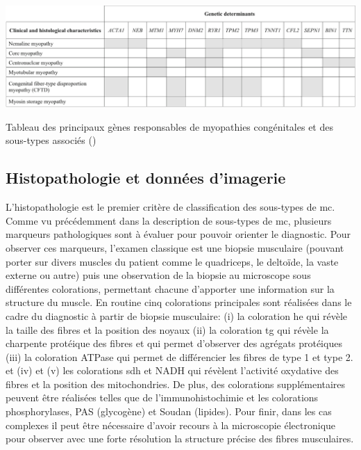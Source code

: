 \begin{table}[!ht]
\centering
\includegraphics[width=1\textwidth]{figures/gene_tab.png}
\caption{Tableau des principaux gènes responsables de myopathies congénitales et des sous-types associés (\cite{cassandrini_congenital_2017})}
\label{tab:gene_myo}
\end{table}
\subsection{Histopathologie et données d'imagerie }
L'histopathologie est le premier critère de classification des sous-types de \gls{mc}. Comme vu précédemment dans la description de sous-types de \gls{mc}, plusieurs marqueurs pathologiques sont à évaluer pour pouvoir orienter le diagnostic. Pour observer ces marqueurs, l'examen classique est une biopsie musculaire (pouvant porter sur divers muscles du patient comme le quadriceps, le deltoïde, la vaste externe ou autre) puis une observation de la biopsie au microscope sous différentes colorations, permettant chacune d'apporter une information sur la structure du muscle. En routine cinq colorations principales sont réalisées dans le cadre du diagnostic à partir de biopsie musculaire: (i) la coloration \gls{he} qui révèle la taille des fibres et la position des noyaux (ii) la coloration \gls{tg} qui révèle la charpente protéique des fibres et qui permet d'observer des agrégats protéiques (iii) la coloration ATPase qui permet de différencier les fibres de type 1 et type 2. et (iv) et (v) les colorations \gls{sdh} et NADH qui révèlent l'activité oxydative des fibres et la position des mitochondries. De plus, des colorations supplémentaires peuvent être réalisées telles que de l'immunohistochimie et les colorations phosphorylases, PAS (glycogène) et Soudan (lipides). Pour finir, dans les cas complexes il peut être nécessaire d'avoir recours à la microscopie électronique pour observer avec une forte résolution la structure précise des fibres musculaires.

